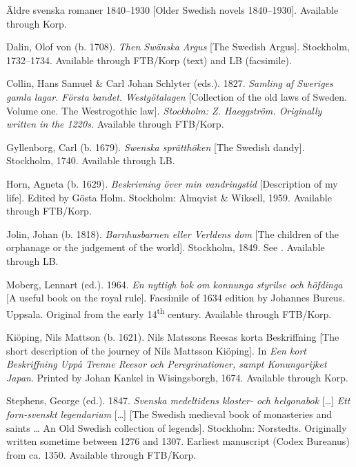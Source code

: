 \documentclass[output=paper]{langscibook}
\begin{document}
\begin{description}[font=\normalfont]\sloppy
\item[\textit{ÄSv}:] Äldre svenska romaner 1840–1930 [Older Swedish novels 1840–1930]. Available through Korp.
\item[\textit{Argus}:] Dalin, Olof von (b. 1708). \textit{Then Swänska Argus} [The Swedish Argus]. Stockholm, 1732–1734. Available through FTB\slash Korp (text) and LB (facsimile).
\item[EWL:] Collin, Hans Samuel \& Carl Johan Schlyter (eds.). 1827. \emph{Samling af Sweriges gamla lagar. Första bandet. Westgötalagen} [Collection of the old laws of Sweden. Volume one. The Westrogothic law]\emph{. \textup{Stockholm: Z. Haeggström}. \textup{Originally written in the 1220s.} }Available through FTB\slash Korp.
\item[Gyllenborg:] Gyllenborg, Carl (b. 1679). \textit{Swenska sprätthöken} [The Swedish dandy]. Stockholm, 1740. Available through LB.
\item[Horn:] Horn, Agneta (b. 1629). \textit{Beskrivning över min vandringstid} [Description of my life]. Edited by Gösta Holm. Stockholm: Almqvist \& Wiksell, 1959. Available through FTB\slash Korp.
\item[Jolin:] Jolin, Johan (b. 1818). \textit{Barnhusbarnen eller Verldens dom} [The children of the orphanage or the judgement of the world]. Stockholm, 1849. See \citet{MarttalaStromquist2001}. Available through LB.
\item[K-styr:] Moberg, Lennart (ed.). 1964. \textit{En nyttigh bok om konnunga styrilse och höfdinga} [A useful book on the royal rule]. Facsimile of 1634 edition by Johannes Bureus. Uppsala. Original from the early 14\textsuperscript{th} century. Available through FTB\slash Korp.
\item[Kiöping:] Kiöping, Nils Mattson (b. 1621). Nils Matssons Reesas korta Beskriffning [The short description of the journey of Nils Mattsson Kiöping]. In \textit{Een kort Beskriffning Uppå Trenne Reesor och Peregrinationer, sampt Konungarijket Japan}. Printed by Johan Kankel in Wisingsborgh, 1674. Available through Korp.
\item[Leg:] Stephens, George (ed.). 1847. \textit{Svenska medeltidens kloster- och helgonabok} […] \textit{Ett forn-svenskt legendarium} […] [The Swedish medieval book of monasteries and saints … An Old Swedish collection of legends]. Stockholm: Norstedts. Originally written sometime between 1276 and 1307. Earliest manuscript (Codex Bureanus) from ca. 1350. Available through FTB\slash Korp.

\end{description}
\end{document}
